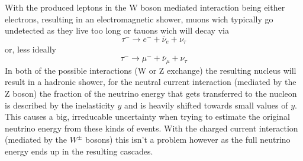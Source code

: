 \documentclass[11pt,a4paper,faculty=we,language=en,doctype=report]{cls/ugent-doc}
\begin{document}
With the produced leptons in the W boson mediated interaction being either electrons,
resulting in an electromagnetic shower, muons wich typically go undetected as they live
too long or
tauons wich will decay via
\begin{equation}
	\tau^- \rightarrow e^- + \bar{\nu}_e + \nu_\tau
\end{equation}
or, less ideally
\begin{equation}
	\tau^- \rightarrow \mu^- + \bar{\nu}_\mu + \nu_\tau
\end{equation}
In both of the possible interactions (W or Z exchange) the resulting nucleus
will result in a hadronic shower, for the neutral current interaction (mediated
by the Z boson) the fraction of the neutrino energy that gets transferred to
the nucleon is described by the inelasticity $y$ and is heavily shifted towards
small values of $y$\cite{elasticity_y}. This causes a big, irreducable
uncertainty when trying to estimate the original neutrino energy from these
kinds of events.  With the charged current interaction (mediated by the $W^\pm$
bosons) this isn't a problem however as the full neutrino energy ends up in the
resulting cascades.
\end{document}
